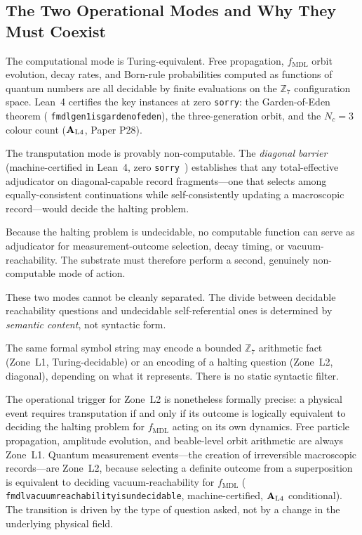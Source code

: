 \documentclass[12pt,letterpaper]{article}
\newcommand{\fmdl}{f_{\mathrm{MDL}}}
\newcommand{\Zseven}{\mathbb{Z}_7}
\newcommand{\catAL}{\ensuremath{\textbf{A}_{\rm L4}}}
\newcommand{\lean}[1]{%
  \penalty-100
  \begingroup\def\_{\textunderscore\allowbreak}\texttt{#1}\endgroup}
\begin{document}
\subsection{The Two Operational Modes and Why They Must Coexist}
\label{sec:two-modes}

The computational mode is Turing-equivalent.  Free propagation, $\fmdl$ orbit
evolution, decay rates, and Born-rule probabilities computed as functions of quantum
numbers are all decidable by finite evaluations on the $\Zseven$ configuration space.
Lean~4 certifies the key instances at zero \texttt{sorry}: the Garden-of-Eden
theorem (\lean{fmdl\_gen1\_is\allowbreak\_garden\_of\_eden}), the three-generation orbit, and the $N_c = 3$
colour count (\catAL, Paper P28).

The transputation mode is provably non-computable.  The \emph{diagonal barrier}
(machine-certified in Lean~4, zero \texttt{sorry}~\cite{SpivackNEMS11}) establishes that
any total-effective adjudicator on diagonal-capable record fragments---one that selects
among equally-consistent continuations while self-consistently updating a macroscopic
record---would decide the halting problem.

Because the halting problem is undecidable, no computable function can serve as
adjudicator for measurement-outcome selection, decay timing, or vacuum-reachability.
The substrate must therefore perform a second, genuinely non-computable mode of action.

These two modes cannot be cleanly separated.  The divide between decidable
reachability questions and undecidable self-referential ones is determined by
\emph{semantic content}, not syntactic form.

The same formal symbol string may encode a bounded $\Zseven$ arithmetic fact (Zone~L1,
Turing-decidable) or an encoding of a halting question (Zone~L2, diagonal), depending
on what it represents.  There is no static syntactic filter.

The operational trigger for Zone~L2 is nonetheless formally precise: a physical event
requires transputation if and only if its outcome is logically equivalent to deciding
the halting problem for $\fmdl$ acting on its own dynamics.  Free particle propagation,
amplitude evolution, and beable-level orbit arithmetic are always Zone~L1.  Quantum
measurement events---the creation of irreversible macroscopic records---are Zone~L2,
because selecting a definite outcome from a superposition is equivalent to deciding
vacuum-reachability for $\fmdl$ (\lean{fmdl\_vacuum\_reachability\_is\_undecidable},
machine-certified, \catAL{} conditional).  The transition is driven by the type of
question asked, not by a change in the underlying physical field.
\end{document}
